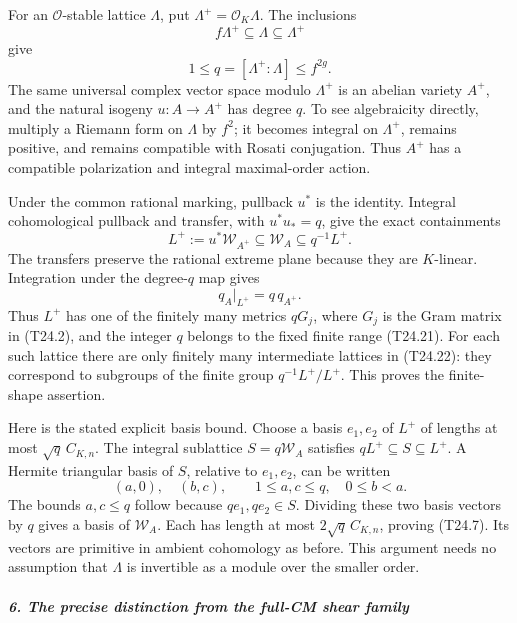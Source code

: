 \documentclass[11pt,a4paper]{article}
\theoremstyle{definition}
\begin{document}
For an \(\mathcal O\)-stable lattice \(\Lambda\), put \(\Lambda^+=\mathcal O_K\Lambda\). The inclusions \[
 f\Lambda^+\subseteq\Lambda\subseteq\Lambda^+
 \tag{T24.20}
\] give \[
 1\le q=[\Lambda^+:\Lambda]\le f^{2g}.
 \tag{T24.21}
\] The same universal complex vector space modulo \(\Lambda^+\) is an abelian variety \(A^+\), and the natural isogeny \(u:A\to A^+\) has degree \(q\). To see algebraicity directly, multiply a Riemann form on \(\Lambda\) by \(f^2\); it becomes integral on \(\Lambda^+\), remains positive, and remains compatible with Rosati conjugation. Thus \(A^+\) has a compatible polarization and integral maximal-order action.

Under the common rational marking, pullback \(u^*\) is the identity. Integral cohomological pullback and transfer, with \(u^*u_*=q\), give the exact containments \[
 L^+:=u^*\mathscr W_{A^+}
      \subseteq\mathscr W_A
      \subseteq q^{-1}L^+.
 \tag{T24.22}
\] The transfers preserve the rational extreme plane because they are \(K\)-linear. Integration under the degree-\(q\) map gives \[
 q_A|_{L^+}=q\,q_{A^+}.
 \tag{T24.23}
\] Thus \(L^+\) has one of the finitely many metrics \(qG_j\), where \(G_j\) is the Gram matrix in (T24.2), and the integer \(q\) belongs to the fixed finite range (T24.21). For each such lattice there are only finitely many intermediate lattices in (T24.22): they correspond to subgroups of the finite group \(q^{-1}L^+/L^+\). This proves the finite-shape assertion.

Here is the stated explicit basis bound. Choose a basis \(e_1,e_2\) of \(L^+\) of lengths at most \(\sqrt q\,C_{K,n}\). The integral sublattice \(S=q\mathscr W_A\) satisfies \(qL^+\subseteq S\subseteq L^+\). A Hermite triangular basis of \(S\), relative to \(e_1,e_2\), can be written \[
 (a,0),\quad (b,c),\qquad
 1\le a,c\le q,\quad 0\le b<a.
 \tag{T24.24}
\] The bounds \(a,c\le q\) follow because \(q e_1,q e_2\in S\). Dividing these two basis vectors by \(q\) gives a basis of \(\mathscr W_A\). Each has length at most \(2\sqrt q\,C_{K,n}\), proving (T24.7). Its vectors are primitive in ambient cohomology as before. This argument needs no assumption that \(\Lambda\) is invertible as a module over the smaller order.

\subparagraph{6. The precise distinction from the full-CM shear family}\label{the-precise-distinction-from-the-full-cm-shear-family}
\end{document}
